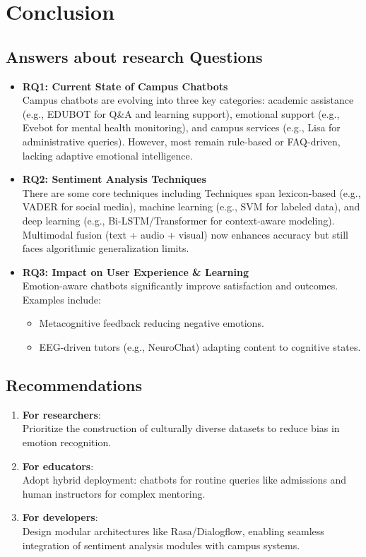 \documentclass{xum_review}
\begin{document}
\section{Conclusion}

\subsection{Answers about research Questions}

\begin{itemize}
    \item \textbf{RQ1: Current State of Campus Chatbots}\\Campus chatbots are evolving
    into three key categories: academic assistance (e.g., EDUBOT for Q\&A and
    learning support), emotional support (e.g., Evebot for mental health
    monitoring), and campus services (e.g., Lisa for administrative queries).
    However, most remain rule-based or FAQ-driven, lacking adaptive emotional
    intelligence.

    \item \textbf{RQ2: Sentiment Analysis Techniques}\\There are some core
    techniques including Techniques span lexicon-based (e.g., VADER for social
    media), machine learning (e.g., SVM for labeled data), and deep learning
    (e.g., Bi-LSTM/Transformer for context-aware modeling). Multimodal fusion
    (text + audio + visual) now enhances accuracy but still faces algorithmic
    generalization limits.

    \item \textbf{RQ3: Impact on User Experience \& Learning}\\Emotion-aware
    chatbots significantly improve satisfaction and outcomes. Examples include:
    \begin{itemize}
        \item Metacognitive feedback reducing negative emotions.
        \item EEG-driven tutors (e.g., NeuroChat) adapting content to cognitive
        states.
    \end{itemize}
\end{itemize}

\subsection{Recommendations}

\begin{enumerate}
    \item \textbf{For researchers}:\\Prioritize the construction of culturally diverse
    datasets to reduce bias in emotion recognition.
    \item \textbf{For educators}:\\Adopt hybrid deployment: chatbots for routine
    queries like admissions and human instructors for complex mentoring.
    \item \textbf{For developers}:\\Design modular architectures like
    Rasa/Dialogflow, enabling seamless integration of sentiment analysis modules
    with campus systems.
\end{enumerate}
\end{document}
